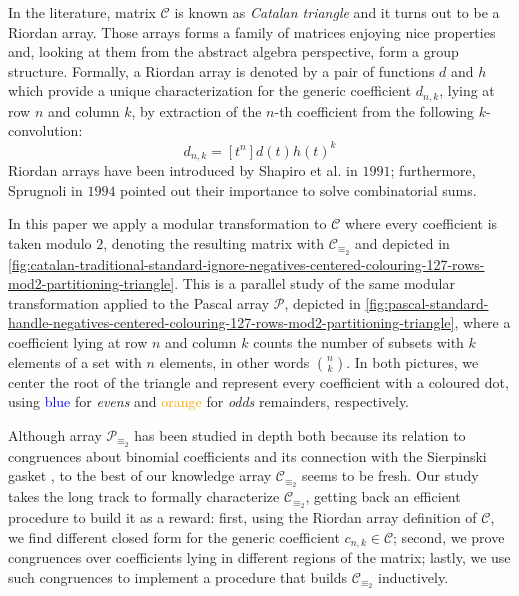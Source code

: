 In the literature, matrix $\mathcal{C}$ is known as \emph{Catalan triangle} and
it turns out to be a Riordan array. Those arrays forms a family of matrices enjoying
nice properties and, looking at them from the abstract algebra perspective, 
form a group structure. 
Formally, a Riordan array is denoted by a pair of functions $d$ and $h$ which provide a unique 
characterization for the generic coefficient $d_{n,k}$, lying at row $n$ and column $k$, 
by extraction of the $n$-th coefficient from the following $k$-convolution:
\begin{equation}
    d_{n,k} = [t^{n}]d(t)h(t)^{k}
    \label{eq:Riordan:array:coefficient}
\end{equation}
Riordan arrays have been introduced by Shapiro et al. \cite{shapiro:1991} in $1991$;
furthermore, Sprugnoli \cite{sprugnoli:1991} in $1994$ pointed out their importance
to solve combinatorial sums.

In this paper we apply a modular transformation to $\mathcal{C}$ where every coefficient 
is taken modulo $2$, denoting the resulting matrix with $\mathcal{C}_{\equiv_{2}}$ and
depicted in \autoref{fig:catalan-traditional-standard-ignore-negatives-centered-colouring-127-rows-mod2-partitioning-triangle}.
This is a parallel study of the same modular transformation applied to the Pascal array $\mathcal{P}$,
depicted in \autoref{fig:pascal-standard-handle-negatives-centered-colouring-127-rows-mod2-partitioning-triangle},
where a coefficient lying at row $n$ and column $k$ counts the number of subsets
with $k$ elements of a set with $n$ elements, in other words ${{n}\choose{k}}$.
In both pictures, we center the root of the triangle and represent every coefficient 
with a coloured dot, using \textcolor{blue}{blue} for \emph{evens} and \textcolor{orange}{orange} 
for \emph{odds} remainders, respectively. 

Although array $\mathcal{P}_{\equiv_{2}}$ has been studied in depth both because its 
relation to congruences about binomial coefficients and its connection with
the Sierpinski gasket \cite{stewart:four:encounters:sierpinski} \cite{sokolov},
to the best of our knowledge array $\mathcal{C}_{\equiv_{2}}$ seems to be fresh.  
Our study takes the long track to formally characterize $\mathcal{C}_{\equiv_{2}}$,
getting back an efficient procedure to build it as a reward: first,
using the Riordan array definition of $\mathcal{C}$, we find different closed form for
the generic coefficient $c_{n,k}\in\mathcal{C}$; second, we prove congruences over coefficients
lying in different regions of the matrix; lastly, we use such congruences to implement a procedure
that builds $\mathcal{C}_{\equiv_{2}}$ inductively. 

